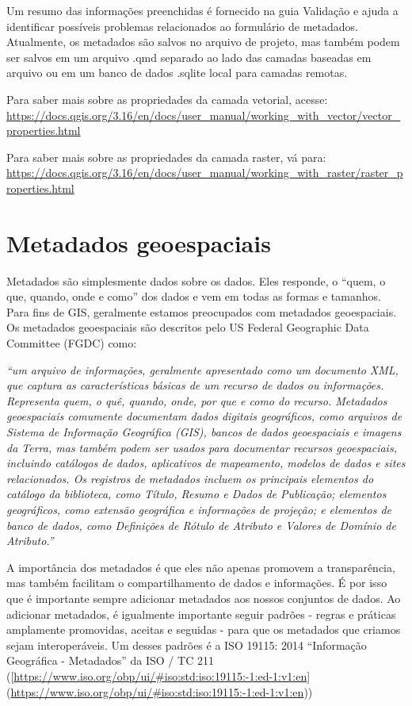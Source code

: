 \documentclass[
  portuguese,
]{krantz}
\begin{document}
Um resumo das informações preenchidas é fornecido na guia Validação e ajuda a identificar possíveis problemas relacionados ao formulário de metadados. Atualmente, os metadados são salvos no arquivo de projeto, mas também podem ser salvos em um arquivo .qmd separado ao lado das camadas baseadas em arquivo ou em um banco de dados .sqlite local para camadas remotas.

Para saber mais sobre as propriedades da camada vetorial, acesse: \href{https://docs.qgis.org/3.16/en\%20/docs/user_manual/working_with_vector/vector_properties.html}{https://docs.qgis.org/3.16/en/docs/user\_manual/working\_with\_vector/vector\_properties.html}

Para saber mais sobre as propriedades da camada raster, vá para: \href{https:\%20//docs.qgis.org/3.16/en/docs/user_manual/working_with_raster/raster_properties.html}{https://docs.qgis.org/3.16/en/docs/user\_manual/working\_with\_raster/raster\_properties.html}

\hypertarget{metadados-geoespaciais}{%
\section{Metadados geoespaciais}\label{metadados-geoespaciais}}

Metadados são simplesmente dados sobre os dados. Eles responde, o ``quem, o que, quando, onde e como'' dos dados e vem em todas as formas e tamanhos. Para fins de GIS, geralmente estamos preocupados com metadados geoespaciais. Os metadados geoespaciais são descritos pelo US Federal Geographic Data Committee (FGDC) como:

\emph{``um arquivo de informações, geralmente apresentado como um documento XML, que captura as características básicas de um recurso de dados ou informações. Representa quem, o quê, quando, onde, por que e como do recurso. Metadados geoespaciais comumente documentam dados digitais geográficos, como arquivos de Sistema de Informação Geográfica (GIS), bancos de dados geoespaciais e imagens da Terra, mas também podem ser usados para documentar recursos geoespaciais, incluindo catálogos de dados, aplicativos de mapeamento, modelos de dados e sites relacionados. Os registros de metadados incluem os principais elementos do catálogo da biblioteca, como Título, Resumo e Dados de Publicação; elementos geográficos, como extensão geográfica e informações de projeção; e elementos de banco de dados, como Definições de Rótulo de Atributo e Valores de Domínio de Atributo.''}

A importância dos metadados é que eles não apenas promovem a transparência, mas também facilitam o compartilhamento de dados e informações. É por isso que é importante sempre adicionar metadados aos nossos conjuntos de dados. Ao adicionar metadados, é igualmente importante seguir padrões - regras e práticas amplamente promovidas, aceitas e seguidas - para que os metadados que criamos sejam interoperáveis. Um desses padrões é a ISO 19115: 2014 ``Informação Geográfica - Metadados'' da ISO / TC 211 ({[}\url{https://www.iso.org/obp/ui/\#iso:std:iso:19115:-1:ed-1:v1:en}{]} (\url{https://www.iso.org/obp/ui/\#iso:std:iso:19115:-1:ed-1:v1:en}))
\end{document}
